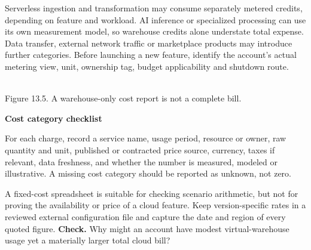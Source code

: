 \documentclass[11pt,twoside]{article}
\begin{document}
Serverless ingestion and transformation may consume separately metered credits, depending on feature and workload. AI inference or specialized processing can use its own measurement model, so warehouse credits alone understate total expense. Data transfer, external network traffic or marketplace products may introduce further categories. Before launching a new feature, identify the account's actual metering view, unit, ownership tag, budget applicability and shutdown route.
\begin{center}\\{\fontsize{8}{9}\selectfont\color{inkgray}Figure 13.5. A warehouse-only cost report is not a complete bill.}\end{center}
\begin{whitebox}\textbf{Cost category checklist}\par
For each charge, record a service name, usage period, resource or owner, raw quantity and unit, published or contracted price source, currency, taxes if relevant, data freshness, and whether the number is measured, modeled or illustrative. A missing cost category should be reported as unknown, not zero.
\end{whitebox}
A fixed-cost spreadsheet is suitable for checking scenario arithmetic, but not for proving the availability or price of a cloud feature. Keep version-specific rates in a reviewed external configuration file and capture the date and region of every quoted figure.
\textbf{Check.} Why might an account have modest virtual-warehouse usage yet a materially larger total cloud bill?
\end{document}
